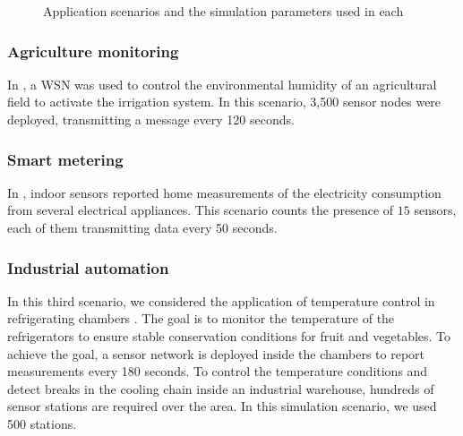 \documentclass[]{article}
\begin{document}
\setcounter{figure}{1}
\begin{figure}
\begin{center}
\caption{Application scenarios and the simulation parameters used in each} \label{fig:sce_param}
\end{center}
\end{figure}

\subsubsection{Agriculture monitoring}

In \cite{scenario1}, a WSN was used to control the environmental humidity of an agricultural field to activate the irrigation system. In this scenario, 3,500 sensor nodes were deployed, transmitting a message every 120 seconds. 
 
\subsubsection{Smart metering}

In \cite{scenario3}, indoor sensors reported home measurements of the electricity consumption from several electrical appliances. This scenario counts the presence of $15$ sensors, each of them transmitting data every 50 seconds.

\subsubsection{Industrial automation}


In this third scenario, we considered the application of temperature control in refrigerating chambers \cite{scenario2}. The goal is to monitor the temperature of the refrigerators to ensure stable conservation conditions for fruit and vegetables. To achieve the goal, a sensor network is deployed inside the chambers to report measurements every 180 seconds. To control the temperature conditions and detect breaks in the cooling chain inside an industrial warehouse, hundreds of sensor stations are required over the area. In this simulation scenario, we used 500 stations.
\end{document}
